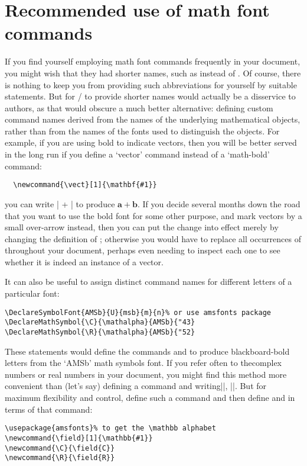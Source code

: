 \documentclass[leqno,titlepage,openany]{amsldoc}[1999/12/13]
\newcommand{\vect}[1]{\mathbf{#1}}
\begin{document}
\section{Recommended use of math font commands}

If you find yourself employing math font commands frequently in your
document, you might wish that they had shorter names, such as 
instead of . Of course, there is nothing to keep you from
providing such abbreviations for yourself by suitable 
statements. But for \latex/ to provide shorter names would actually be a
disservice to authors, as that would obscure a much better alternative:
defining custom command names derived from the names of the underlying
mathematical objects, rather than from the names of the fonts used to
distinguish the objects. For example, if you are using bold to indicate
vectors, then you will be better served in the long run if you define a
`vector' command instead of a `math-bold' command:
\begin{verbatim}
  \newcommand{\vect}[1]{\mathbf{#1}}
\end{verbatim}
you can write |\vect{a} + \vect{b}| to produce $\vect{a} +
\vect{b}$.
If you decide several months down the road that you want to use the bold
font for some other purpose, and mark vectors by a small over-arrow
instead, then you can put the change into effect merely by changing the
definition of ; otherwise you would have to replace all
occurrences of  throughout your document, perhaps even
needing to inspect each one to see whether it is indeed
an instance of a vector.

It can also be useful to assign distinct
command names for different letters of a particular font:
\begin{verbatim}
\DeclareSymbolFont{AMSb}{U}{msb}{m}{n}% or use amsfonts package
\DeclareMathSymbol{\C}{\mathalpha}{AMSb}{"43}
\DeclareMathSymbol{\R}{\mathalpha}{AMSb}{"52}
\end{verbatim}
These statements would define the commands  and  to produce
blackboard-bold letters from the `AMSb' math symbols font. If you refer
often to the\break complex numbers or real numbers in your document, you
might find this method more convenient than (let's say) defining a
 command and writing\break ||, ||. But for
maximum flexibility and control, define such a  command and
then define  and  in terms of that
command:
\begin{verbatim}
\usepackage{amsfonts}% to get the \mathbb alphabet
\newcommand{\field}[1]{\mathbb{#1}}
\newcommand{\C}{\field{C}}
\newcommand{\R}{\field{R}}
\end{verbatim}
\end{document}
